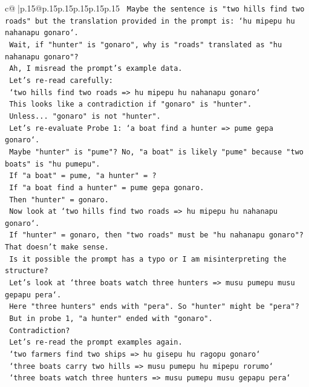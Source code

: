\documentclass{article}
\begin{document}
{\begin{supertabular}{c@{$\;$}|p{.15\linewidth}@{}p{.15\linewidth}p{.15\linewidth}p{.15\linewidth}p{.15\linewidth}p{.15\linewidth}}
{{{\texttt{   Maybe the sentence is "two hills find two roads" but the translation provided in the prompt is: `hu mipepu hu nahanapu gonaro`.} \\
\texttt{   Wait, if "hunter" is "gonaro", why is "roads" translated as "hu nahanapu gonaro"?} \\
\texttt{   Ah, I misread the prompt's example data.} \\
\texttt{   Let's re{-}read carefully:} \\
\texttt{   `two hills find two roads => hu mipepu hu nahanapu gonaro`} \\
\texttt{   This looks like a contradiction if "gonaro" is "hunter".} \\
\texttt{   Unless... "gonaro" is not "hunter".} \\
\texttt{   Let's re{-}evaluate Probe 1: `a boat find a hunter => pume gepa gonaro`.} \\
\texttt{   Maybe "hunter" is "pume"? No, "a boat" is likely "pume" because "two boats" is "hu pumepu".} \\
\texttt{   If "a boat" = pume, "a hunter" = ?} \\
\texttt{   If "a boat find a hunter" = pume gepa gonaro.} \\
\texttt{   Then "hunter" = gonaro.} \\
\texttt{   Now look at `two hills find two roads => hu mipepu hu nahanapu gonaro`.} \\
\texttt{   If "hunter" = gonaro, then "two roads" must be "hu nahanapu gonaro"? That doesn't make sense.} \\
\texttt{   Is it possible the prompt has a typo or I am misinterpreting the structure?} \\
\texttt{   Let's look at `three boats watch three hunters => musu pumepu musu gepapu pera`.} \\
\texttt{   Here "three hunters" ends with "pera". So "hunter" might be "pera"?} \\
\texttt{   But in probe 1, "a hunter" ended with "gonaro".} \\
\texttt{   Contradiction?} \\
\texttt{   Let's re{-}read the prompt examples again.} \\
\texttt{   `two farmers find two ships => hu gisepu hu ragopu gonaro`} \\
\texttt{   `three boats carry two hills => musu pumepu hu mipepu rorumo`} \\
\texttt{   `three boats watch three hunters => musu pumepu musu gepapu pera`} \\
}}}
\end{supertabular}}
\end{document}
